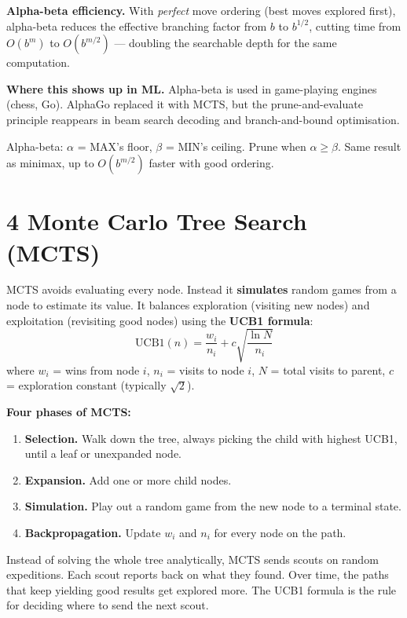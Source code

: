 \documentclass[a4paper,11pt]{article}
\begin{document}
\textbf{Alpha-beta efficiency.} With \emph{perfect} move ordering (best moves explored first), alpha-beta reduces the effective branching factor from $b$ to $b^{1/2}$, cutting time from $O(b^m)$ to $O(b^{m/2})$ — doubling the searchable depth for the same computation.

\textbf{Where this shows up in ML.} Alpha-beta is used in game-playing engines (chess, Go). AlphaGo replaced it with MCTS, but the prune-and-evaluate principle reappears in beam search decoding and branch-and-bound optimisation.

\begin{keytake}
Alpha-beta: $\alpha$ = MAX's floor, $\beta$ = MIN's ceiling. Prune when $\alpha \geq \beta$. Same result as minimax, up to $O(b^{m/2})$ faster with good ordering.
\end{keytake}

\section{4 \quad Monte Carlo Tree Search (MCTS)}

MCTS avoids evaluating every node. Instead it \textbf{simulates} random games from a node to estimate its value. It balances exploration (visiting new nodes) and exploitation (revisiting good nodes) using the \textbf{UCB1 formula}:
\[
\text{UCB1}(n) = \frac{w_i}{n_i} + c\sqrt{\frac{\ln N}{n_i}}
\]
where $w_i$ = wins from node $i$, $n_i$ = visits to node $i$, $N$ = total visits to parent, $c$ = exploration constant (typically $\sqrt{2}$).

\textbf{Four phases of MCTS:}
\begin{enumerate}
  \item \textbf{Selection.} Walk down the tree, always picking the child with highest UCB1, until a leaf or unexpanded node.
  \item \textbf{Expansion.} Add one or more child nodes.
  \item \textbf{Simulation.} Play out a random game from the new node to a terminal state.
  \item \textbf{Backpropagation.} Update $w_i$ and $n_i$ for every node on the path.
\end{enumerate}

\begin{intuition}
Instead of solving the whole tree analytically, MCTS sends scouts on random expeditions. Each scout reports back on what they found. Over time, the paths that keep yielding good results get explored more. The UCB1 formula is the rule for deciding where to send the next scout.
\end{intuition}
\end{document}

